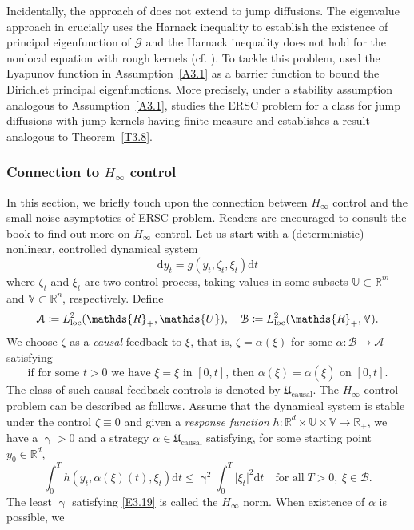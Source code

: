 \documentclass[notitlepage,11pt,reqno]{amsart}
\numberwithin{equation}{section}
\theoremstyle{plain}
\theoremstyle{definition}
\theoremstyle{remark}
\newcommand{\Act}{{\mathds{U}}}
\newcommand{\cA}{\mathcal{A}}
\newcommand{\cB}{{\mathcal{B}}}     %
\newcommand{\cG}{{\mathcal{G}}}     %
\newcommand{\Uc}{\mathfrak{U}_{\mathrm{causal}}}
\newcommand{\RR}{\mathds{R}} %
\newcommand{\Rd}{{\mathds{R}^{d}}}
\newcommand{\D}{\mathrm{d}} %
\newcommand{\abs}[1]{\lvert#1\rvert}
\newcommand{\df}{\coloneqq}
\begin{document}
Incidentally, the approach of \cite{MR3926044} does not extend to jump diffusions. The eigenvalue approach in \cite{MR3926044,MR3780687} crucially uses
the Harnack inequality to establish the existence of principal eigenfunction of $\cG$ and the Harnack inequality does not hold for the nonlocal equation
with rough kernels (cf. \cite[Example~1.1]{MR3942851}). To tackle this problem, \cite{AB2022} used the Lyapunov function in Assumption~\ref{A3.1} as a barrier
function to bound the Dirichlet principal eigenfunctions. More precisely, under a stability assumption analogous to Assumption~\ref{A3.1}, \cite{AB2022} studies the
ERSC problem for a class for jump diffusions with jump-kernels having finite measure and establishes
a result analogous to Theorem~\ref{T3.8}.

\subsubsection{Connection to $H_\infty$ control}\label{H-infinity}
In this section, we briefly touch upon the connection between $H_\infty$ control and the small noise asymptotics of ERSC problem. Readers are encouraged to
consult the book \cite{MR1353236} to find out more on $H_\infty$ control. Let us start with a (deterministic) nonlinear, controlled dynamical system
$$\D{y}_t= g(y_t, \zeta_t, \xi_t)\D{t}$$
where $\zeta_t$ and $\xi_t$ are two control process, taking values in some subsets $\Act \subset \RR^m$ and $\mathbb{V}\subset\RR^n$, respectively. 
Define 
$$\cA\df L^2_{\rm loc}(\RR_+, \Act), \quad \cB\df L^2_{\rm loc}(\RR_+, \mathbb{V}).$$ 
We choose 
$\zeta$ as a {\it causal} feedback to $\xi$, that is, $\zeta=\alpha(\xi)$ for some $\alpha:\cB\to\cA$ satisfying
$$\text{if for some $t>0$ we have $\xi=\bar\xi$ in $[0, t]$, then $\alpha(\xi)=\alpha(\bar\xi)$ on $[0, t]$.}$$
The class of such causal feedback controls is denoted by $\Uc$.
The $H_\infty$ control problem can be described as follows. Assume that the dynamical system is stable under the control $\zeta\equiv 0$ and
given a {\it response function} $h:\Rd\times\Act\times\mathbb{V}\to\RR_+$, we have a $\upgamma>0$ and a strategy $\alpha\in \Uc$
satisfying, for some starting point $y_0\in\Rd$, 
\begin{equation}\label{E3.19}
\int_0^T h(y_t, \alpha(\xi)(t), \xi_t) \D{t}\leq \upgamma^2 \int_0^T \abs{\xi_t}^2 \D{t}\quad \text{for all}\; T>0, \ \xi\in \cB.
\end{equation}
The least $\upgamma$ satisfying \eqref{E3.19} is called the $H_\infty$ norm. When existence of $\alpha$ is possible, we
\end{document}
